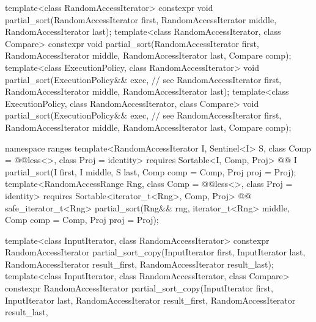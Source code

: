 \begin{codeblock}
  template<class RandomAccessIterator>
    constexpr void partial_sort(RandomAccessIterator first,
                                RandomAccessIterator middle,
                                RandomAccessIterator last);
  template<class RandomAccessIterator, class Compare>
    constexpr void partial_sort(RandomAccessIterator first,
                                RandomAccessIterator middle,
                                RandomAccessIterator last, Compare comp);
  template<class ExecutionPolicy, class RandomAccessIterator>
    void partial_sort(ExecutionPolicy&& exec, // see 
                      RandomAccessIterator first,
                      RandomAccessIterator middle,
                      RandomAccessIterator last);
  template<class ExecutionPolicy, class RandomAccessIterator, class Compare>
    void partial_sort(ExecutionPolicy&& exec, // see 
                      RandomAccessIterator first,
                      RandomAccessIterator middle,
                      RandomAccessIterator last, Compare comp);
\end{codeblock}\begin{addedblock}\begin{codeblock}
  namespace ranges {
    template<RandomAccessIterator I, Sentinel<I> S, class Comp = @@less<>,
        class Proj = identity>
      requires Sortable<I, Comp, Proj>
      @@ I
        partial_sort(I first, I middle, S last, Comp comp = Comp{}, Proj proj = Proj{});
    template<RandomAccessRange Rng, class Comp = @@less<>, class Proj = identity>
      requires Sortable<iterator_t<Rng>, Comp, Proj>
      @@ safe_iterator_t<Rng>
        partial_sort(Rng&& rng, iterator_t<Rng> middle, Comp comp = Comp{},
                     Proj proj = Proj{});
  }
\end{codeblock}\end{addedblock}\begin{codeblock}
  template<class InputIterator, class RandomAccessIterator>
    constexpr RandomAccessIterator
      partial_sort_copy(InputIterator first, InputIterator last,
                        RandomAccessIterator result_first,
                        RandomAccessIterator result_last);
  template<class InputIterator, class RandomAccessIterator, class Compare>
    constexpr RandomAccessIterator
      partial_sort_copy(InputIterator first, InputIterator last,
                        RandomAccessIterator result_first,
                        RandomAccessIterator result_last,

\end{codeblock}
